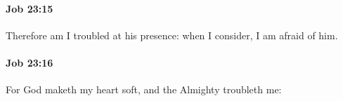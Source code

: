 		\paragraph{Job 23:15} %
			\label{JOB-23-15}

			Therefore am I troubled at his presence: when I consider, I am afraid of him.


		\paragraph{Job 23:16} %
			\label{JOB-23-16}

			For God maketh my heart soft, and the Almighty troubleth me:


